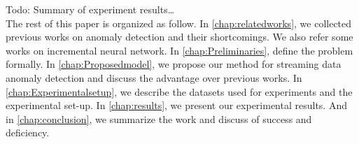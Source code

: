 Todo: Summary of experiment results…\\

The rest of this paper is organized as follow. In \autoref{chap:relatedworks}, we collected previous works on anomaly detection and their shortcomings. We also refer some works on incremental neural network. In \autoref{chap:Preliminaries}, define the problem formally. In \autoref{chap:Proposedmodel}, we propose our method for streaming data anomaly detection and discuss the advantage over previous works. In \autoref{chap:Experimentalsetup}, we describe the datasets used for experiments and the experimental set-up. In \autoref{chap:results}, we present our experimental results. And in \autoref{chap:conclusion}, we summarize the work and discuss of success and deficiency.

